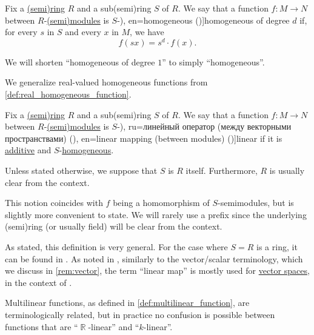 \begin{definition}\label{def:homogeneous_function}\mimprovised
  Fix a \hyperref[def:semiring]{(semi)ring} \( R \) and a sub(semi)ring \( S \) of \( R \). We say that a function \( f: M \to N \) between \( R \)-\hyperref[def:semimodule]{(semi)modules} is \( S \)-\term[ru=однородная (\cite[416]{Зорич2019АнализЧасть1}), en=homogeneous (\cite[def. 2.3.1]{HillePhillips1996FunctionalAnalysis})]{homogeneous} of degree \( d \) if, for every \( s \) in \( S \) and every \( x \) in \( M \), we have
  \begin{equation}\label{eq:def:homogeneous_function}
    f(sx) = s^d \cdot f(x).
  \end{equation}

  We will shorten \enquote{homogeneous of degree \( 1 \)} to simply \enquote{homogeneous}.
\end{definition}
\begin{comments}
  \item We generalize real-valued homogeneous functions from \cref{def:real_homogeneous_function}.
\end{comments}

\begin{definition}\label{def:linear_function}\mimprovised
  Fix a \hyperref[def:semiring]{(semi)ring} \( R \) and a sub(semi)ring \( S \) of \( R \). We say that a function \( f: M \to N \) between \( R \)-\hyperref[def:semimodule]{(semi)modules} is \( S \)-\term[bg=линейно преобразувание (между линейни пространства) (\cite[101]{Обрешков1962ВисшаАлгебра}), ru=линейный оператор (между векторными пространствами) (\cite[236]{Тыртышников2007ЛинейнаяАлгебра}), en=linear mapping (between modules) (\cite[def. II.9.1]{Bourbaki1998Algebra1to3})]{linear} if it is \hyperref[def:additive_function]{additive} and \( S \)-\hyperref[def:homogeneous_function]{homogeneous}.

  Unless stated otherwise, we suppose that \( S \) is \( R \) itself. Furthermore, \( R \) is usually clear from the context.
\end{definition}
\begin{comments}
  \item This notion coincides with \( f \) being a homomorphism of \( S \)-semimodules, but is slightly more convenient to state. We will rarely use a prefix since the underlying (semi)ring (or usually field) will be clear from the context.

  \item As stated, this definition is very general. For the case where \( S = R \) is a ring, it can be found in \cite[def. II.9.1]{Bourbaki1998Algebra1to3}. As noted in \cite[158]{Aluffi2009Algebra}, similarly to the vector/scalar terminology, which we discuss in \cref{rem:vector}, the term \enquote{linear map} is mostly used for \hyperref[def:vector_space]{vector spaces}, in the context of .

  \item Multilinear functions, as defined in \cref{def:multilinear_function}, are terminologically related, but in practice no confusion is possible between functions that are \enquote{\( \BbbR \)-linear} and \enquote{\( k \)-linear}.
\end{comments}

